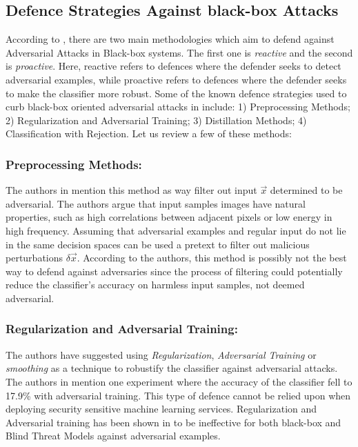 \documentclass[grad,lot,lof,11pt,oneside,onehalfspace]{RUthesis}
\begin{document}
\subsection{Defence Strategies Against black-box Attacks}
According to \cite{papernot_practical_2017}, there are two main methodologies which aim to defend against Adversarial Attacks in Black-box systems. The first one is \textit{reactive} and the second is \textit{proactive}. Here, reactive refers to defences where the defender seeks to detect adversarial examples, while proactive refers to defences where the defender seeks to make the classifier more robust. Some of the known defence strategies used to curb black-box oriented adversarial attacks  in \cite{hosseini_blocking_2017} include: 1) Preprocessing  Methods; 2) Regularization and Adversarial Training; 3) Distillation Methods; 4) Classification with Rejection. Let us review a few of these methods:
\subsubsection{Preprocessing Methods: }  The authors in  \cite{papernot_distillation_2016} mention this method as way filter out input \textit{$\vec{x}$} determined to be adversarial. The authors argue that input samples images have natural properties, such as high correlations between adjacent pixels or low energy in high frequency. Assuming that adversarial examples and regular input do not lie in the same decision spaces can be used a pretext to filter out malicious perturbations \textit{$\delta\vec{x}$}. According to the authors, this method is possibly not the best way to defend against adversaries since the process of filtering could potentially reduce the classifier's accuracy on harmless input samples, not deemed adversarial. 
\subsubsection{Regularization and Adversarial Training: } The authors have suggested using \textit{Regularization}, \textit{Adversarial Training} or \textit{smoothing} as a technique to robustify the classifier against adversarial attacks. The authors in \cite{goodfellow_explaining_2015} mention one experiment where the accuracy of the classifier fell to 17.9\% with adversarial training. This type of defence cannot be relied upon when deploying security sensitive machine learning services. Regularization and Adversarial training has been shown in \cite{hosseini_blocking_2017} to be ineffective for both black-box and Blind Threat Models against adversarial examples.  
\end{document}
